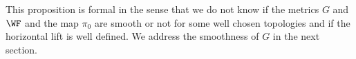 This proposition is  formal in the sense that we do not know if the metrics $G$ and $\WF$ and the map $\pi_0$ are smooth or not for some well chosen topologies and if the horizontal lift is well defined. We address the smoothness of $G$ in the next section.

%

